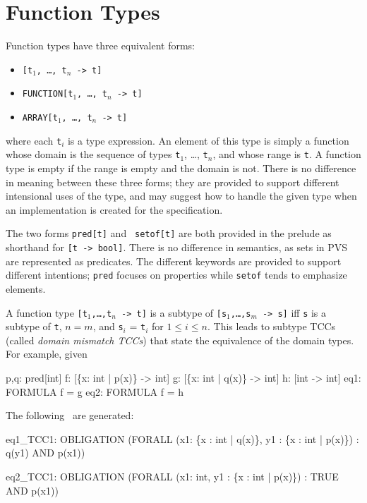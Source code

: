 

\section{Function Types}\label{function-types}

Function types have three equivalent forms:
\begin{itemize}
\item {\tt [t\(_1\), \ldots, t\(_n\) -> t]}

\item {\tt FUNCTION[t\(_1\), \ldots, t\(_n\) -> t]}

\item {\tt ARRAY[t\(_1\), \ldots, t\(_n\) -> t]}
\end{itemize}
%
where each {\tt t$_i$} is a type expression.  An element of this type is
simply a function whose domain is the sequence of types {\tt t$_1$},
\ldots, {\tt t$_n$}, and whose range is {\tt t}.  A function type is empty
if the range is empty and the domain is not.  There is no difference in
meaning between these three forms; they are provided to support different
intensional uses of the type, and may suggest how to handle the given type
when an implementation is created for the specification.

The two forms {\tt pred[t]} and {\tt
setof[t]} are both provided in the
prelude as shorthand for {\tt [t ->
bool]}.  There is no difference in semantics, as sets in
PVS are represented as predicates.  The different keywords are
provided to support different intentions; {\tt pred} focuses on
properties while {\tt setof} tends to emphasize elements.

A function type \texttt{[t$_1$,\ldots,t$_n$ -> t]} is a subtype of
\texttt{[s$_1$,\ldots,s$_m$ -> s]} iff \texttt{s} is a subtype of
\texttt{t}, $n = m$, and {\tt s$_i$} = {\tt t$_i$} for $1 \leq i \leq n$.
This leads to subtype TCCs (called \emph{domain mismatch
TCCs}) that state
the equivalence of the domain types.  For example, given
\begin{pvsex}
  p,q: pred[int]
  f: [\{x: int | p(x)\} -> int]
  g: [\{x: int | q(x)\} -> int]
  h: [int -> int]
  eq1: FORMULA f = g
  eq2: FORMULA f = h
\end{pvsex}
%
The following \tccs\ are generated:
\begin{pvsex}
eq1_TCC1: OBLIGATION
  (FORALL (x1: \{x : int | q(x)\}, y1 : \{x : int | p(x)\}) :
     q(y1) AND p(x1))

eq2_TCC1: OBLIGATION
  (FORALL (x1: int, y1 : \{x : int | p(x)\}) :
     TRUE AND p(x1))
\end{pvsex}

